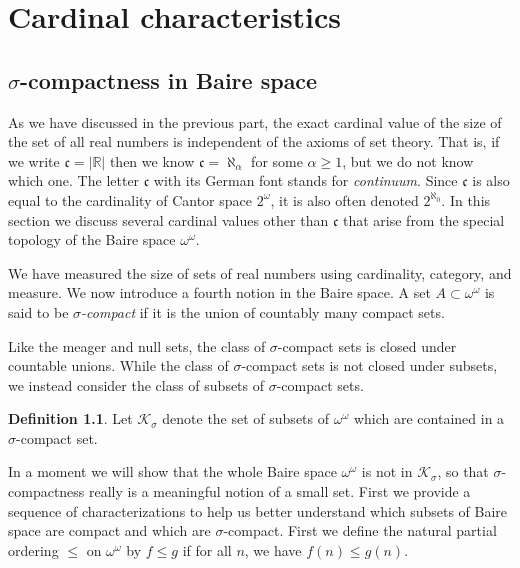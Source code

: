\documentclass[11pt,oneside]{amsbook}
\newcommand{\R}{\mathbb R}
\theoremstyle{definition}
\theoremstyle{plain}
\theoremstyle{definition}
\newtheorem{definition}[theorem]{Definition}
\theoremstyle{remark}
\numberwithin{equation}{section}
\numberwithin{figure}{section}
\begin{document}
\chapter{Cardinal characteristics}

\section{$\sigma$-compactness in Baire space}

As we have discussed in the previous part, the exact cardinal value of the size of the set of all real numbers is independent of the axioms of set theory. That is, if we write $\mathfrak c=|\R|$ then we know $\mathfrak c=\aleph_\alpha$ for some $\alpha\geq1$, but we do not know which one. The letter $\mathfrak c$ with its German font stands for \emph{continuum}. Since $\mathfrak c$ is also equal to the cardinality of Cantor space $2^\omega$, it is also often denoted $2^{\aleph_0}$. In this section we discuss several cardinal values other than $\mathfrak c$ that arise from the special topology of the Baire space $\omega^\omega$.

We have measured the size of sets of real numbers using cardinality, category, and measure. We now introduce a fourth notion in the Baire space. A set $A\subset\omega^\omega$ is said to be \emph{$\sigma$-compact} if it is the union of countably many compact sets.

Like the meager and null sets, the class of $\sigma$-compact sets is closed under countable unions. While the class of $\sigma$-compact sets is not closed under subsets, we instead consider the class of subsets of $\sigma$-compact sets.

\begin{definition}
  Let $\mathcal K_\sigma$ denote the set of subsets of $\omega^\omega$ which are contained in a $\sigma$-compact set.
\end{definition}

In a moment we will show that the whole Baire space $\omega^\omega$ is not in $\mathcal K_\sigma$, so that $\sigma$-compactness really is a meaningful notion of a small set. First we provide a sequence of characterizations to help us better understand which subsets of Baire space are compact and which are $\sigma$-compact. First we define the natural partial ordering $\leq$ on $\omega^\omega$ by $f\leq g$ if for all $n$, we have $f(n)\leq g(n)$.
\end{document}
